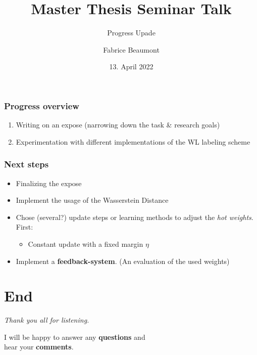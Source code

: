 

\title[MA Seminar Talk - Progress]{Master Thesis Seminar Talk}
\subtitle{Progress Upade}
\author[F. Beaumont]{Fabrice Beaumont}
\date{13. April 2022}



\begin{frame}
	\titlepage
\end{frame}

\begin{frame}
\frametitle{Progress overview} \vspace{-1cm}
	\begin{enumerate}
		\item Writing on an expose (narrowing down the task \& research goals) 
		\newline
		\item Experimentation with different implementations of the WL labeling scheme
	\end{enumerate}
\end{frame}

\begin{frame}
\frametitle{Next steps}
	\begin{itemize}
		\item Finalizing the expose
		\newline
		\item Implement the usage of the Wasserstein Distance\newline
		\item Chose (several?) update steps or learning methods to adjust the \textit{hot weights}. First:
		\begin{itemize}
			\item Constant update with a fixed margin $\eta$\newline
		\end{itemize}
		\item Implement a \textbf{feedback-system}. (An evaluation of the used weights)
	\end{itemize}	
\end{frame}

\section{End}
\begin{frame}[c]
	\centering %
	\begin{huge}
		\emph{Thank you all for listening.}\\
	\end{huge}
	\vspace{2 cm}
	I will be happy to answer any \textbf{questions} and\\
	hear your \textbf{comments}.
\end{frame}

